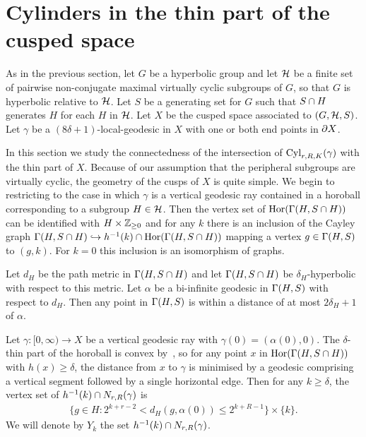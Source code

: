 \section{Cylinders in the thin part of the cusped space}\label{section:geodesics_in_thin_part}

As in the previous section, let $G$ be a hyperbolic group and let $\mathcal{H}$ be a finite set of pairwise non-conjugate maximal virtually cyclic subgroups of $G$, so that $G$ is hyperbolic relative to $\mathcal{H}$. 
Let $S$ be a generating set for $G$ such that $S \cap H$ generates $H$ for each $H$ in $\mathcal{H}$. 
Let $X$ be the cusped space associated to $(G, \mathcal{H}, S)$.
Let $\gamma$ be a $(8\delta + 1)$-local-geodesic in $X$ with one or both end points in $\partial X$.

In this section we study the connectedness of the intersection of $\operatorname{Cyl}_{r, R, K}(\gamma)$ with the thin part of $X$.
Because of our assumption that the peripheral subgroups are virtually cyclic, the geometry of the cusps of $X$ is quite simple. 
We begin to restricting to the case in which $\gamma$ is a vertical geodesic ray contained in a horoball corresponding to a subgroup $H \in \mathcal{H}$.
Then the vertex set of $\operatorname{Hor}(\operatorname{\Gamma}(H, S\cap H))$ can be identified with $H \times \mathbb{Z}_{\geq 0}$ and for any $k$ there is an inclusion of the Cayley graph $\operatorname{\Gamma}(H, S \cap H) \hookrightarrow h^{-1}(k) \cap \operatorname{Hor}(\operatorname{\Gamma}(H, S \cap H))$ mapping a vertex $g \in \operatorname{\Gamma}(H, S)$ to $(g, k)$. 
For $k = 0$ this inclusion is an isomorphism of graphs. 

Let $d_H$ be the path metric in $\operatorname{\Gamma}(H, S \cap H)$ and let $\operatorname{\Gamma}(H, S \cap H)$ be $\delta_H$-hyperbolic with respect to this metric. 
Let $\alpha$ be a bi-infinite geodesic in $\operatorname{\Gamma}(H, S)$ with respect to $d_H$. 
Then any point in $\operatorname{\Gamma}(H, S)$ is within a distance of at most $2\delta_H + 1$ of $\alpha$.

Let $\gamma \colon [0, \infty) \to X$ be a vertical geodesic ray with $\gamma(0) = (\alpha(0), 0)$. 
The $\delta$-thin part of the horoball is convex by~\cite[Lemma 3.26]{grovesmanning08}, so for any point $x$ in $\operatorname{Hor}(\Gamma(H, S \cap H))$ with $h(x) \geq \delta$, the distance from $x$ to $\gamma$ is minimised by a geodesic comprising a vertical segment followed by a single horizontal edge.
Then for any $k \geq \delta$, the vertex set of $h^{-1}(k) \cap N_{r, R}(\gamma)$ is
\begin{align}
  \{g \in H \colon 2^{k + r - 2} < d_H(g, \alpha(0)) \leq 2^{k + R - 1}\} \times \{k\}.
\end{align} 
We will denote by $Y_k$ the set $h^{-1}(k) \cap N_{r, R}(\gamma)$. 

